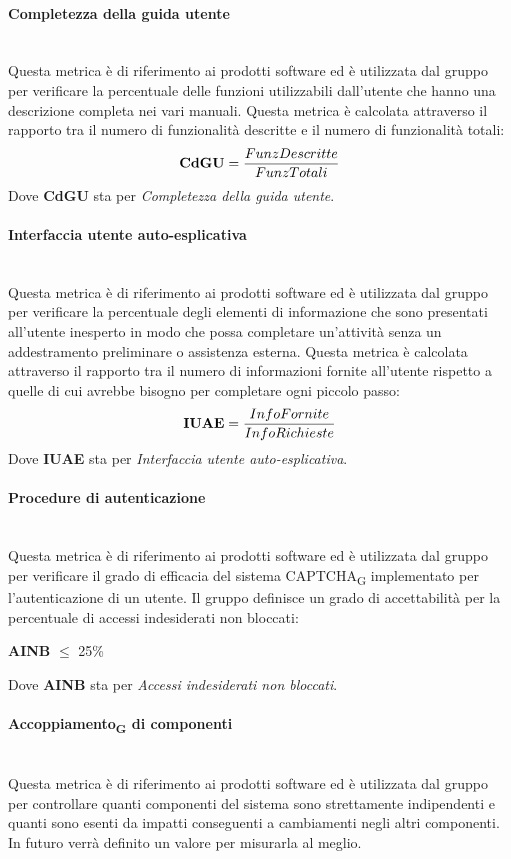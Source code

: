 \paragraph{Completezza della guida utente}\mbox{}\\
Questa metrica è di riferimento ai prodotti software ed è utilizzata dal gruppo per verificare la percentuale delle funzioni utilizzabili dall'utente che hanno una descrizione completa nei vari manuali. Questa metrica è calcolata attraverso il rapporto tra il numero di funzionalità descritte e il numero di funzionalità totali:
\begin{align*}
	\centering
	\textbf{CdGU} = \frac{FunzDescritte}{FunzTotali}
\end{align*}
Dove \textbf{CdGU} sta per \textit{Completezza della guida utente}.
\paragraph{Interfaccia utente auto-esplicativa}\mbox{}\\
Questa metrica è di riferimento ai prodotti software ed è utilizzata dal gruppo per verificare la percentuale degli elementi di informazione che sono presentati all’utente inesperto in modo che possa completare un’attività senza un addestramento preliminare o assistenza esterna. Questa metrica è calcolata attraverso il rapporto tra il numero di informazioni fornite all'utente rispetto a quelle di cui avrebbe bisogno per completare ogni piccolo passo:
\begin{align*}
	\centering
	\textbf{IUAE} = \frac{InfoFornite}{InfoRichieste}
\end{align*}
Dove \textbf{IUAE} sta per \textit{Interfaccia utente auto-esplicativa}.
\paragraph{Procedure di autenticazione}\mbox{}\\
Questa metrica è di riferimento ai prodotti software ed è utilizzata dal gruppo per verificare il grado di efficacia del sistema CAPTCHA\textsubscript{G} implementato per l'autenticazione di un utente. Il gruppo definisce un grado di accettabilità per la percentuale di accessi indesiderati non bloccati:
\begin{center}
	\textbf{AINB} $\le$ 25\%
\end{center}
Dove \textbf{AINB} sta per \textit{Accessi indesiderati non bloccati}.
\paragraph{Accoppiamento\textsubscript{G} di componenti}\mbox{}\\
Questa metrica è di riferimento ai prodotti software ed è utilizzata dal gruppo per controllare quanti componenti del sistema sono strettamente  indipendenti e quanti sono esenti da impatti conseguenti a cambiamenti negli altri componenti.
In futuro verrà definito un valore per misurarla al meglio. 
\newpage
